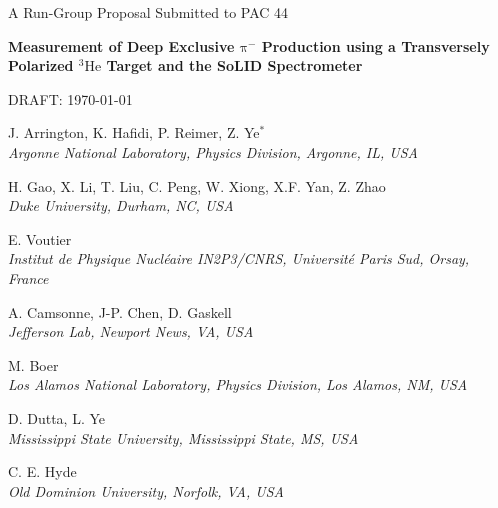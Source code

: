 \documentclass{article}
\begin{document}

\begin{center}

{\Huge A Run-Group Proposal Submitted to PAC 44}

\vspace*{25pt}

{\LARGE\bf
Measurement of Deep Exclusive $\mathrm\pi^-$ Production
using a Transversely Polarized $\mathrm{^{3}He}$ Target
and the SoLID Spectrometer}

\vspace*{2ex}
DRAFT: \today

\vspace*{30pt}

J. Arrington, K. Hafidi, P. Reimer, Z. Ye$^\ast$ \\
\vspace*{5pt}
{\it Argonne National Laboratory, Physics Division, Argonne, IL, USA}
\vspace*{15pt}

H. Gao, X. Li, T. Liu, C. Peng, W. Xiong, X.F. Yan, Z. Zhao\\
\vspace*{5pt}
{\it Duke University, Durham, NC, USA}
\vspace*{15pt}

E. Voutier\\
\vspace*{5pt}
{\it Institut de Physique Nucl\'eaire IN2P3/CNRS, Universit\'e Paris Sud, 
Orsay, France}
\vspace*{15pt}

A. Camsonne,  J-P. Chen, D. Gaskell\\
\vspace*{5pt}
{\it  Jefferson Lab, Newport News, VA, USA}
\vspace*{15pt}

M. Boer\\
\vspace*{5pt}
{\it Los Alamos National Laboratory, Physics Division, Los Alamos, NM, USA}
\vspace*{15pt}

D. Dutta, L. Ye\\
\vspace*{5pt}
{\it Mississippi State University, Mississippi State, MS, USA}
\vspace*{15pt}

C. E. Hyde \\
\vspace*{5pt}
{\it Old Dominion University, Norfolk, VA, USA}
\vspace*{15pt}


\end{center}
\end{document}
